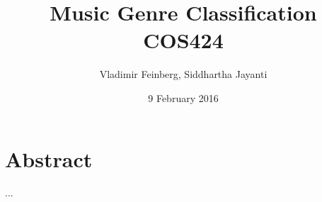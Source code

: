 \documentclass{article}
\title{Music Genre Classification\\\large COS424}
\author{Vladimir Feinberg, Siddhartha Jayanti}
\date{9 February 2016}
\begin{document}
\maketitle

\section{Abstract}

...
\end{document}
